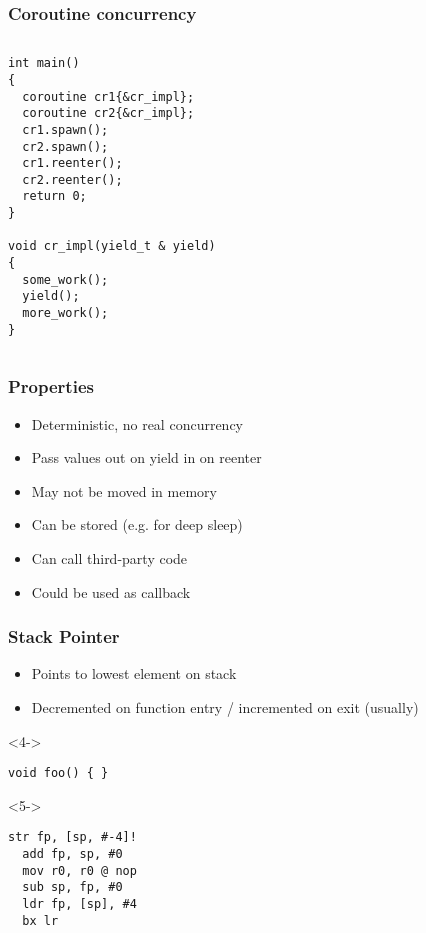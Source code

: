 \documentclass{beamer}
\begin{document}
\begin{frame}[fragile]
\frametitle{Coroutine concurrency}
\begin{columns}
\begin{column}{0.65\textwidth}
\begin{block}{}

\begin{lstlisting}[basicstyle=\small]
int main()
{
  coroutine cr1{&cr_impl};
  coroutine cr2{&cr_impl};
  cr1.spawn();
  cr2.spawn();
  cr1.reenter();
  cr2.reenter();
  return 0;
}

void cr_impl(yield_t & yield)
{
  some_work();
  yield();
  more_work();
}
\end{lstlisting}
\end{block}
\end{column}
\begin{column}{0.35\textwidth}
\begin{adjustbox}{max totalsize={.95\textwidth}{.85\textheight},center}

\end{adjustbox}
\end{column}
\end{columns}
\end{frame}

\begin{frame}
\frametitle{Properties}
\begin{itemize}
\item<1-> Deterministic, no real concurrency
\item<2-> Pass values out on yield in on reenter
\item<3-> May not be moved in memory
\item<4-> Can be stored (e.g. for deep sleep)
\item<5-> Can call third-party code
\item<6-> Could be used as callback
\end{itemize}
\end{frame}




\begin{frame}[fragile]
\frametitle{Stack Pointer}
\begin{itemize}
\item<1-> Points to lowest element on stack
\item<2-> Decremented on function entry / incremented on exit (usually)
\end{itemize}

\begin{block}<4->{}
\begin{lstlisting}
void foo() { }
\end{lstlisting}
\end{block}

\begin{block}<5->{}
\begin{lstlisting}[language=ASM]
  str fp, [sp, #-4]!
  add fp, sp, #0
  mov r0, r0 @ nop
  sub sp, fp, #0
  ldr fp, [sp], #4
  bx lr
\end{lstlisting}
\end{block}

\end{frame}
\end{document}

